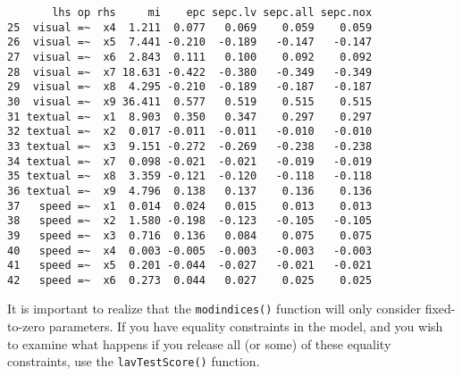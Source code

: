 \begin{verbatim}
       lhs op rhs     mi    epc sepc.lv sepc.all sepc.nox
25  visual =~  x4  1.211  0.077   0.069    0.059    0.059
26  visual =~  x5  7.441 -0.210  -0.189   -0.147   -0.147
27  visual =~  x6  2.843  0.111   0.100    0.092    0.092
28  visual =~  x7 18.631 -0.422  -0.380   -0.349   -0.349
29  visual =~  x8  4.295 -0.210  -0.189   -0.187   -0.187
30  visual =~  x9 36.411  0.577   0.519    0.515    0.515
31 textual =~  x1  8.903  0.350   0.347    0.297    0.297
32 textual =~  x2  0.017 -0.011  -0.011   -0.010   -0.010
33 textual =~  x3  9.151 -0.272  -0.269   -0.238   -0.238
34 textual =~  x7  0.098 -0.021  -0.021   -0.019   -0.019
35 textual =~  x8  3.359 -0.121  -0.120   -0.118   -0.118
36 textual =~  x9  4.796  0.138   0.137    0.136    0.136
37   speed =~  x1  0.014  0.024   0.015    0.013    0.013
38   speed =~  x2  1.580 -0.198  -0.123   -0.105   -0.105
39   speed =~  x3  0.716  0.136   0.084    0.075    0.075
40   speed =~  x4  0.003 -0.005  -0.003   -0.003   -0.003
41   speed =~  x5  0.201 -0.044  -0.027   -0.021   -0.021
42   speed =~  x6  0.273  0.044   0.027    0.025    0.025
\end{verbatim}

It is important to realize that the \texttt{modindices()} function will
only consider fixed-to-zero parameters. If you have equality constraints
in the model, and you wish to examine what happens if you release all
(or some) of these equality constraints, use the \texttt{lavTestScore()}
function.
